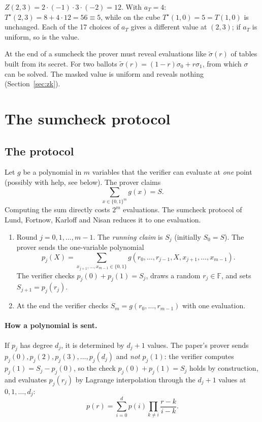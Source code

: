 \documentclass[11pt,a4paper]{article}
\newcommand{\F}{\mathbb{F}}
\newcommand{\cube}[1]{\{0,1\}^{#1}}
\newcommand{\mle}[1]{\widetilde{#1}}
\newcommand{\msk}[1]{#1^{\star}}
\theoremstyle{definition}
\theoremstyle{plain}
\begin{document}
\begin{example}
$Z(2,3)=2\cdot(-1)\cdot 3\cdot(-2)=12$. With $a_T=4$: $\msk T(2,3)=8+4\cdot 12=56\equiv 5$, while on the
cube $\msk T(1,0)=5=T(1,0)$ is unchanged. Each of the 17 choices of $a_T$ gives a different value at
$(2,3)$; if $a_T$ is uniform, so is the value.
\end{example}

\begin{why}
At the end of a sumcheck the prover must reveal evaluations like $\mle\sigma(r)$ of tables built from
its secret. For two ballots $\mle\sigma(r)=(1-r)\sigma_0+r\sigma_1$, from which $\sigma$ can be solved.
The masked value is uniform and reveals nothing (Section~\ref{sec:zk}).
\end{why}

\section{The sumcheck protocol}
\label{sec:sumcheck}

\subsection{The protocol}

Let $g$ be a polynomial in $m$ variables that the verifier can evaluate at \emph{one} point
(possibly with help, see below). The prover claims
\[
  \sum_{x\in\cube{m}}g(x)=S .
\]
Computing the sum directly costs $2^m$ evaluations. The sumcheck protocol of Lund, Fortnow, Karloff
and Nisan reduces it to one evaluation.

\begin{enumerate}[leftmargin=1.5em]
\item Round $j=0,1,\dots,m-1$. The \emph{running claim} is $S_j$ (initially $S_0=S$). The prover sends
  the one-variable polynomial
  \[
    p_j(X)=\sum_{x_{j+1},\dots,x_{m-1}\in\{0,1\}} g(r_0,\dots,r_{j-1},X,x_{j+1},\dots,x_{m-1}).
  \]
  The verifier checks $p_j(0)+p_j(1)=S_j$, draws a random $r_j\in\F$, and sets $S_{j+1}=p_j(r_j)$.
\item At the end the verifier checks $S_m=g(r_0,\dots,r_{m-1})$ with one evaluation.
\end{enumerate}

\paragraph{How a polynomial is sent.} If $p_j$ has degree $d_j$, it is determined by $d_j+1$
values. The paper's prover sends $p_j(0),p_j(2),p_j(3),\dots,p_j(d_j)$ and \emph{not} $p_j(1)$: the
verifier computes $p_j(1)=S_j-p_j(0)$, so the check $p_j(0)+p_j(1)=S_j$ holds by construction, and
evaluates $p_j(r_j)$ by Lagrange interpolation through the $d_j+1$ values at $0,1,\dots,d_j$:
\[
  p(r)=\sum_{i=0}^{d}p(i)\prod_{k\neq i}\frac{r-k}{i-k}.
\]
\end{document}
